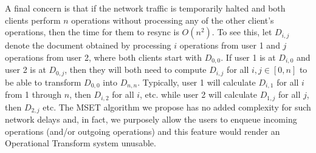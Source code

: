 \documentclass{amsart}
\begin{document}
A final concern is that if the network traffic is temporarily halted and both
clients perform $n$ operations without processing any of the other client's
operations, then the time for them to resync is $O(n^2)$. To see this, let $D_{i,j}$ denote the document obtained by processing $i$ operations from user 1 and $j$ operations from user 2, where both clients start with $D_{0,0}$. If user 1 is at $D_{i,0}$ and user 2 is at $D_{0,j}$, then they will both need to compute $D_{i,j}$ for all $i,j\in[0,n]$ to be able to transform $D_{0,0}$ into $D_{n,n}$. Typically,
user 1 will calculate $D_{i,1}$ for all $i$ from 1 through $n$, then $D_{i,2}$ for all $i$, etc. while user 2 will calculate $D_{1,j}$ for all $j$, then $D_{2,j}$ etc. The MSET algorithm we propose has no added complexity for such network delays and, in fact, we purposely allow the users to enqueue incoming operations (and/or outgoing operations) and this feature would render an Operational Transform system unusable.
\end{document}
